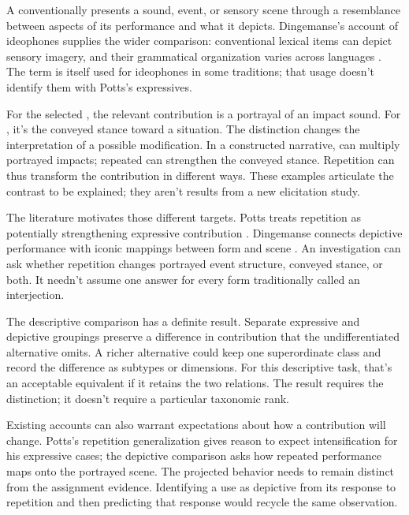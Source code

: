 \documentclass[12pt]{article}
\begin{document}
A  conventionally presents a sound, event, or sensory
scene through a resemblance between aspects of its performance and what
it depicts. Dingemanse's account of ideophones supplies the wider comparison:
conventional lexical items can depict sensory imagery, and their grammatical
organization varies across languages \citep[2--3]{dingemanse2018}.
The term  is itself used for ideophones in some traditions;
that usage doesn't identify them with Potts's expressives.

For the selected , the relevant contribution is a portrayal
of an impact sound. For , it's the conveyed stance toward
a situation. The distinction changes the interpretation of a possible
modification. In a constructed narrative,  can
multiply portrayed impacts; repeated  can strengthen the
conveyed stance. Repetition can thus transform the contribution in
different ways. These examples articulate the contrast to be explained;
they aren't results from a new elicitation study.

The literature motivates those different targets. Potts treats repetition
as potentially strengthening expressive contribution \citep[181--182]{potts2007}.
Dingemanse connects depictive performance with iconic mappings between
form and scene \citep[10--11]{dingemanse2018}. An investigation can
ask whether repetition changes portrayed event structure, conveyed stance,
or both. It needn't assume one answer for every form traditionally
called an interjection.

The descriptive comparison has a definite result. Separate expressive
and depictive groupings preserve a difference in contribution that the
undifferentiated alternative omits. A richer alternative could keep one
superordinate class and record the difference as subtypes or dimensions.
For this descriptive task, that's an acceptable equivalent if it retains
the two relations. The result requires the distinction; it doesn't require
a particular taxonomic rank.

Existing accounts can also warrant expectations about how a contribution
will change. Potts's repetition generalization gives reason to expect
intensification for his expressive cases; the depictive comparison asks
how repeated performance maps onto the portrayed scene. The projected
behavior needs to remain distinct from the assignment evidence. Identifying
a use as depictive from its response to repetition and then predicting
that response would recycle the same observation.
\end{document}
